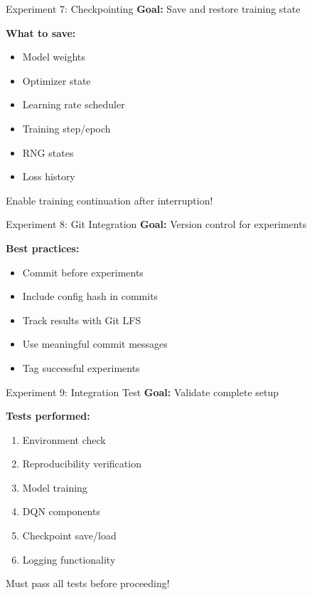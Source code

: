 \documentclass[aspectratio=169,10pt]{beamer}
\begin{document}
\begin{frame}{Experiment 7: Checkpointing}
\textbf{Goal:} Save and restore training state

\textbf{What to save:}
\begin{itemize}
    \item Model weights
    \item Optimizer state
    \item Learning rate scheduler
    \item Training step/epoch
    \item RNG states
    \item Loss history
\end{itemize}

Enable training continuation after interruption!
\end{frame}

\begin{frame}{Experiment 8: Git Integration}
\textbf{Goal:} Version control for experiments

\textbf{Best practices:}
\begin{itemize}
    \item Commit before experiments
    \item Include config hash in commits
    \item Track results with Git LFS
    \item Use meaningful commit messages
    \item Tag successful experiments
\end{itemize}
\end{frame}

\begin{frame}{Experiment 9: Integration Test}
\textbf{Goal:} Validate complete setup

\textbf{Tests performed:}
\begin{enumerate}
    \item Environment check
    \item Reproducibility verification
    \item Model training
    \item DQN components
    \item Checkpoint save/load
    \item Logging functionality
\end{enumerate}

Must pass all tests before proceeding!
\end{frame}
\end{document}
